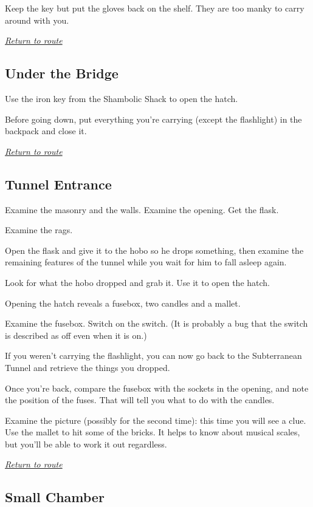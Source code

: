 \documentclass[a5paper]{extarticle}
\begin{document}
Keep the key but put the gloves back on the shelf.
They are too manky to carry around with you.

\hyperref[sec:route-3]{\emph{Return to route}}

\newpage
\subsection{Under the Bridge}\label{sec:sol-Under-the-Bridge}

Use the iron key from the Shambolic Shack to open the hatch.

Before going down, put everything you're carrying (except the flashlight)
in the backpack and close it.

\hyperref[sec:route-4]{\emph{Return to route}}

\newpage
\subsection{Tunnel Entrance}\label{sec:sol-Tunnel-Entrance}

Examine the masonry and the walls. Examine the opening. Get the flask.

Examine the rags.

Open the flask and give it to the hobo so he drops something,
then examine the remaining features of the tunnel
while you wait for him to fall asleep again.

Look for what the hobo dropped and grab it. Use it to open the hatch.

Opening the hatch reveals a fusebox, two candles and a mallet.

Examine the fusebox. Switch on the switch.
(It is probably a bug that the switch is described as off even when it is on.)

If you weren't carrying the flashlight,
you can now go back to the Subterranean Tunnel and retrieve the things you dropped.

Once you're back,
compare the fusebox with the sockets in the opening, and note the position of the fuses.
That will tell you what to do with the candles.

Examine the picture (possibly for the second time): this time you will see a clue.
Use the mallet to hit some of the bricks. It helps to know about musical scales,
but you'll be able to work it out regardless.

\hyperref[sec:route-4]{\emph{Return to route}}

\newpage
\subsection{Small Chamber}\label{sec:sol-Small-Chamber}
\end{document}
